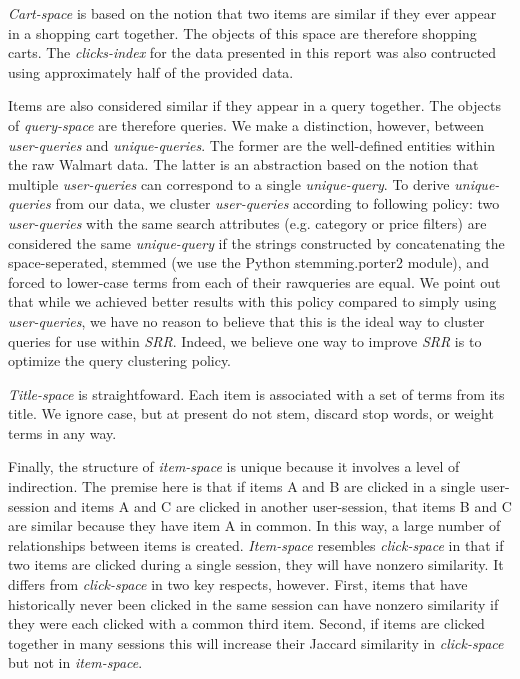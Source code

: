 \documentclass{article}
\begin{document}
{\em Cart-space} is based on the notion that two items are similar if they ever
appear in a shopping cart together. The objects of this space are therefore
shopping carts. The {\em clicks-index} for the data presented in this report was
also contructed using approximately half of the provided data.

Items are also considered similar if they appear in a query together. The
objects of {\em query-space} are therefore queries. We make a distinction,
however, between {\em user-queries} and {\em unique-queries}. The former are the
well-defined entities within the raw Walmart data. The latter is an abstraction
based on the notion that multiple {\em user-queries} can correspond to a single
{\em unique-query}. To derive {\em unique-queries} from our data, we cluster
{\em user-queries} according to following policy: two {\em user-queries} with the same search
attributes (e.g. category or price filters) are considered the same {\em
unique-query} if the strings constructed by concatenating the space-seperated,
stemmed (we use the Python stemming.porter2 module), and forced to lower-case terms
from each of their rawqueries are equal. We point out that while we achieved
better results with this policy compared to simply using {\em user-queries}, we
have no reason to believe that this is the ideal way to cluster queries for use
within {\em SRR}. Indeed, we believe one way to improve {\em SRR} is to optimize 
the query clustering policy.

{\em Title-space} is straightfoward. Each item is associated with a set of terms
from its title. We ignore case, but at present do not stem, discard stop words,
or weight terms in any way. 

Finally, the structure of {\em item-space} is unique because it involves a level
of indirection. The premise here is that if items A and B are clicked in a
single user-session and items A and C are clicked in another user-session, that
items B and C are similar because they have item A in common. In this way, a
large number of relationships between items is created. {\em Item-space}
resembles {\em click-space} in that if two items are clicked during a single
session, they will have nonzero similarity. It differs from {\em click-space} in
two key respects, however. First, items that have historically never been
clicked in the same session can have nonzero similarity if they were each
clicked with a common third item. Second, if items are clicked together in many
sessions this will increase their Jaccard similarity in {\em click-space} but
not in {\em item-space}.
\end{document}

